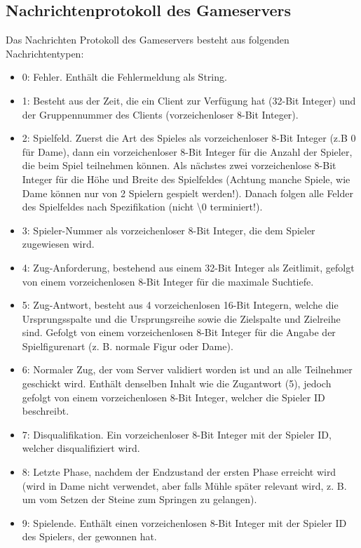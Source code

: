 \documentclass[12pt,a4paper,bibliography=totocnumbered,listof=totocnumbered]{article}
\begin{document}
\begin{appendix}
\section{Nachrichtenprotokoll des Gameservers}
\label{apx:Protokoll}
Das Nachrichten Protokoll des Gameservers besteht aus folgenden Nachrichtentypen:
\begin{itemize}
    \item 0: Fehler. Enthält die Fehlermeldung als String.
    \item 1: Besteht aus der Zeit, die ein Client zur Verfügung hat (32-Bit Integer) und der Gruppennummer des Clients (vorzeichenloser 8-Bit Integer).
    \item 2: Spielfeld. Zuerst die Art des Spieles als vorzeichenloser 8-Bit Integer (z.B 0 für Dame), dann ein vorzeichenloser 8-Bit Integer für die Anzahl der Spieler, die 
    beim Spiel teilnehmen können. Als nächstes zwei vorzeichenlose 8-Bit Integer für die Höhe und Breite des Spielfeldes 
    (Achtung manche Spiele, wie Dame können nur von 2 Spielern gespielt werden!).
    Danach folgen alle Felder des Spielfeldes nach Spezifikation (nicht \textbackslash0 terminiert!).
    \item 3: Spieler-Nummer als vorzeichenloser 8-Bit Integer, die dem Spieler zugewiesen wird.
    \item 4: Zug-Anforderung, bestehend aus einem 32-Bit Integer als Zeitlimit, gefolgt von einem vorzeichenlosen 8-Bit Integer für die maximale Suchtiefe.
    \item 5: Zug-Antwort, besteht aus 4 vorzeichenlosen 16-Bit Integern, welche die Ursprungsspalte und die Ursprungsreihe sowie die Zielspalte und Zielreihe sind.
    Gefolgt von einem vorzeichenlosen 8-Bit Integer für die Angabe der Spielfigurenart (z. B. normale Figur oder Dame).
    \item 6: Normaler Zug, der vom Server validiert worden ist und an alle Teilnehmer geschickt wird. Enthält denselben Inhalt wie die Zugantwort (5), jedoch 
    gefolgt von einem vorzeichenlosen 8-Bit Integer, welcher die Spieler ID beschreibt.
    \item 7: Disqualifikation. Ein vorzeichenloser 8-Bit Integer mit der Spieler ID, welcher disqualifiziert wird.
    \item 8: Letzte Phase, nachdem der Endzustand der ersten Phase erreicht wird (wird in Dame nicht verwendet, aber falls Mühle später relevant wird, z. B. um vom Setzen 
    der Steine zum Springen zu gelangen).
    \item 9: Spielende. Enthält einen vorzeichenlosen 8-Bit Integer mit der Spieler ID des Spielers, der gewonnen hat.
\end{itemize}


\end{appendix}
\end{document}
